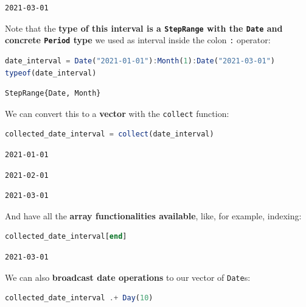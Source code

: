 \documentclass[
  notoc %
]{tufte-book}
\newcommand{\passthrough}[1]{#1}
\begin{document}
\begin{lstlisting}[language=Output]
2021-03-01
\end{lstlisting}

Note that the \textbf{type of this interval is a
\passthrough{\lstinline!StepRange!} with the
\passthrough{\lstinline!Date!} and concrete
\passthrough{\lstinline!Period!} type} we used as interval inside the
colon \passthrough{\lstinline!:!} operator:

\begin{lstlisting}[language=Julia]
date_interval = Date("2021-01-01"):Month(1):Date("2021-03-01")
typeof(date_interval)
\end{lstlisting}

\begin{lstlisting}[language=Output]
StepRange{Date, Month}
\end{lstlisting}

We can convert this to a \textbf{vector} with the
\passthrough{\lstinline!collect!} function:

\begin{lstlisting}[language=Julia]
collected_date_interval = collect(date_interval)
\end{lstlisting}

\begin{lstlisting}[language=Output]
2021-01-01
\end{lstlisting}

\begin{lstlisting}[language=Output]
2021-02-01
\end{lstlisting}

\begin{lstlisting}[language=Output]
2021-03-01
\end{lstlisting}

And have all the \textbf{array functionalities available}, like, for
example, indexing:

\begin{lstlisting}[language=Julia]
collected_date_interval[end]
\end{lstlisting}

\begin{lstlisting}[language=Output]
2021-03-01
\end{lstlisting}

We can also \textbf{broadcast date operations} to our vector of
\passthrough{\lstinline!Date!}s:

\begin{lstlisting}[language=Julia]
collected_date_interval .+ Day(10)
\end{lstlisting}
\end{document}
